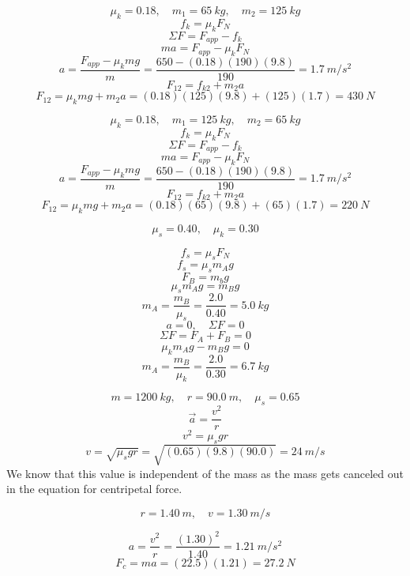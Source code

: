 \documentclass[11pt]{homework}
\begin{document}
\setcounter{questionCounter}{18}
\question
\begin{alphaparts}
    \questionpart
    \[
        \mu_k=0.18, \quad m_1 = \qty{65}{kg}, \quad m_2 = \qty{125}{kg}
    \]
    \[
        f_k = \mu_kF_N
    \]
    \[
        \Sigma F = F_{app} - f_k
    \]
    \[
        ma = F_{app} - \mu_kF_N
    \]
    \[
        a = \frac{F_{app} - \mu_kmg}{m} = \frac{650-(0.18)(190)(9.8)}{190} = \boxed{\qty{1.7}{m/s^2}}
    \]
    \questionpart
    \[
        F_{12} = f_{k2} + m_2a
    \]
    \[
        F_{12} = \mu_kmg + m_2a = (0.18)(125)(9.8) + (125)(1.7) = \boxed{\qty{430}{N}}
    \]
    \questionpart

    \[
        \mu_k=0.18, \quad m_1 = \qty{125}{kg}, \quad m_2 = \qty{65}{kg}
    \]
    \[
        f_k = \mu_kF_N
    \]
    \[
        \Sigma F = F_{app} - f_k
    \]
    \[
        ma = F_{app} - \mu_kF_N
    \]
    \[
        a = \frac{F_{app} - \mu_kmg}{m} = \frac{650-(0.18)(190)(9.8)}{190} = \boxed{\qty{1.7}{m/s^2}}
    \]
    \[
        F_{12} = f_{k2} + m_2a
    \]
    \[
        F_{12} = \mu_kmg + m_2a = (0.18)(65)(9.8) + (65)(1.7) = \boxed{\qty{220}{N}}
    \]
\end{alphaparts}

\setcounter{questionCounter}{22}
\question
\[
\mu_s = 0.40, \quad \mu_k = 0.30
\]
\begin{alphaparts}
    \questionpart
    \[
    f_s = \mu_sF_N
    \]
    \[
    f_s = \mu_sm_Ag
    \]
    \[
    F_B = m_bg
    \]
    \[
    \mu_sm_Ag = m_Bg
    \]
    \[
        m_A = \frac{m_B}{\mu_s} = \frac{2.0}{0.40} = \boxed{\qty{5.0}{kg}}
    \]
    \questionpart
    \[
        a=0, \quad \Sigma F = 0
    \]
    \[
    \Sigma F = F_A + F_B = 0
    \]
    \[
    \mu_km_Ag - m_Bg = 0
    \]
    \[
        m_A = \frac{m_B}{\mu_k} = \frac{2.0}{0.30}=\boxed{\qty{6.7}{kg}}
    \]
\end{alphaparts}

\setcounter{questionCounter}{34}
\question
\[
    m = \qty{1200}{kg}, \quad r = \qty{90.0}{m}, \quad \mu_s = 0.65
\]
\[
    \vec{a}=\frac{v^2}{r}
\]
\[
     v^2=\mu_sgr
\]
\[
    v = \sqrt{\mu_sgr} = \sqrt{(0.65)(9.8)(90.0)} = \boxed{\qty{24}{m/s}}
\]
We know that this value is independent of the mass as the mass gets canceled out in the equation for centripetal force.

\question
\[
    r = \qty{1.40}{m}, \quad v = \qty{1.30}{m/s}
\]
\begin{alphaparts}
    \questionpart
    \[
        a=\frac{v^2}{r}=\frac{(1.30)^2}{1.40} = \boxed{\qty{1.21}{m/s^2}}
    \]
    \questionpart
    \[
        F_c = ma = (22.5)(1.21) = \boxed{\qty{27.2}{N}}
    \]
\end{alphaparts}
\end{document}
